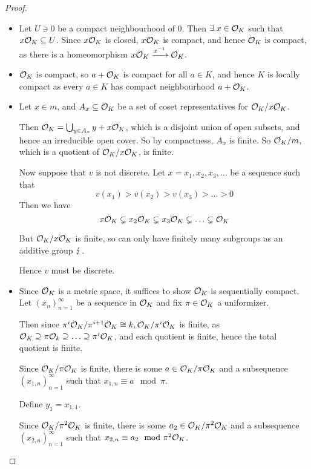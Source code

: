 \documentclass[10pt,a4paper]{article}
\begin{document}
\begin{proof}\hspace*{0cm}
  \begin{itemize}
    \item[\imp{1}{2}] Let $U \ni 0$ be a compact neighbourhood of $0$. Then $\exists x \in \O_K$ such that $x \mathcal{O}_K \subseteq U$. Since $x \mathcal{O}_K$ is closed, $x\mathcal{O}_K$ is compact, and hence $\mathcal{O}_K$ is compact, as there is a homeomorphism $x\mathcal{O}_K \xrightarrow{x^{-1}} \mathcal{O}_K$.

    \item[\imp{2}{1}] $\mathcal{O}_K$ is compact, so $a+\mathcal{O}_K$ is compact for all $a \in K$, and hence $K$ is locally compact as every $a \in K$ has compact neighbourhood $a+\mathcal{O}_K$.

    \item[\imp{2}{3}] Let $x \in m$, and $A_x \subseteq \mathcal{O}_K$ be a set of coset representatives for $\mathcal{O}_K/x\mathcal{O}_K$.

    Then $\mathcal{O}_K = \bigcup_{y \in A_x} y+x\mathcal{O}_K$, which is a disjoint union of open subsets, and hence an irreducible open cover. So by compactness, $A_x$ is finite. So $\mathcal{O}_K/m$, which is a quotient of $\mathcal{O}_K/x\mathcal{O}_K$, is finite.

    Now suppose that $v$ is not discrete. Let $x = x_1, x_2, x_3, \ldots$ be a sequence such that
    \[ v(x_1)>v(x_2)>v(x_3)>\ldots>0\]
    Then we have
    \[ x\mathcal{O}_K \subsetneq x_2\mathcal{O}_K \subsetneq x_3\mathcal{O}_K \subsetneq\ldots \subsetneq \mathcal{O}_K\]

    But $\mathcal{O}_K/x\mathcal{O}_K$ is finite, so can only have finitely many subgroups as an additive group $\lightning$.

    Hence $v$ must be discrete.

    \item[\imp{3}{2}] Since $\mathcal{O}_K$ is a metric space, it suffices to show $\mathcal{O}_K$ is sequentially compact. Let $(x_n)_{n=1}^\infty$ be a sequence in $\mathcal{O}_K$ and fix $\pi \in \mathcal{O}_K$ a uniformizer.

    Then since $\pi^i\mathcal{O}_K/\pi^{i+1}\mathcal{O}_K \cong k, \mathcal{O}_K/\pi^i\mathcal{O}_K$ is finite, as $\mathcal{O}_K \supseteq \pi\mathcal{O}_k \supseteq\ldots\supseteq \pi^i \mathcal{O}_K$, and each quotient is finite, hence the total quotient is finite.

    Since $\mathcal{O}_K/\pi\mathcal{O}_K$ is finite, there is some $a \in \mathcal{O}_K/\pi\mathcal{O}_K$ and a subsequence $(x_{1,n})_{n=1}^\infty$ such that $x_{1,n} \equiv a \mod \pi$.

    Define $y_1 = x_{1,1}$.

    Since $\mathcal{O}_K/\pi^2 \mathcal{O}_K$ is finite, there is some $a_2 \in \mathcal{O}_K/\pi^2 \mathcal{O}_K$ and a subsequence $(x_{2,n})_{n=1}^\infty$ such that $x_{2,n}\equiv a_2 \mod \pi^2 \mathcal{O}_K$.


\end{itemize}
\end{proof}
\end{document}
